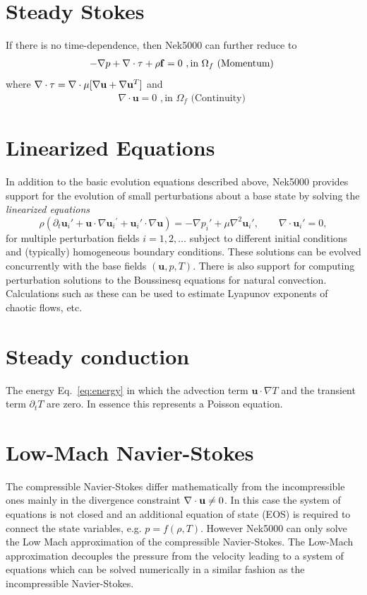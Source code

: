 \section{Steady Stokes }
If there is no time-dependence, then Nek5000 can further reduce to
\begin{eqnarray}\label{eq:ns_momentum_steady_stokes}
 - \nabla p + \nabla \cdot \tau + \rho {\bf f}=0 \,\, , \text{in } \Omega_f \text{  (Momentum)  }
\end{eqnarray}
where \(\nabla \cdot\tau=\nabla\cdot\mu[\nabla \mathbf{u}+\nabla {\mathbf{u} }^{T}]\) and
\begin{eqnarray}\label{eq:ns_cont_steady_stokes}
 \nabla \cdot \mathbf u =0 \,\, , \text{in } \Omega_f  \text{  (Continuity)  } 
\end{eqnarray}

\section{Linearized Equations}
In addition to the basic evolution equations described above, Nek5000
provides support for the evolution of small perturbations about
a base state by solving the {\em linearized equations}
\begin{equation} \label{eq:pertu}
  \rho(\partial_{t} {\mathbf u_i}' + \mathbf u \cdot \nabla {\mathbf u_i}^{'} + \mathbf u_i' \cdot \nabla \mathbf u) =
   - \nabla p_i' + \mu \nabla^2 \mathbf u_i', \qquad \nabla \cdot \mathbf u_i' = 0,
\end{equation}
for multiple perturbation fields \(i=1,2,\dots\) subject to different initial
conditions and (typically) homogeneous boundary conditions.  
These solutions can be evolved concurrently with the base fields \((\mathbf u,p,T)\).
There is also
support for computing perturbation solutions to the Boussinesq equations for
natural convection.  Calculations such as these can be used to estimate Lyapunov exponents of chaotic flows, etc.



\section{Steady conduction}    
The energy Eq.~\ref{eq:energy} in which the advection term \(\mathbf u \cdot \nabla T\)
    and the transient term \(\partial_{t} T\) are zero. In essence this represents a Poisson equation.
    

\section{Low-Mach Navier-Stokes}\label{sec:lowma}
The compressible Navier-Stokes differ mathematically from the incompressible ones mainly in the divergence constraint \(\nabla \cdot \mathbf{u}\neq 0\). In this case the system of equations is not closed and an additional equation of state (EOS) is required to connect the state variables, e.g. \(p=f(\rho,T)\). However Nek5000 can only solve the Low Mach approximation of the compressible Navier-Stokes. The Low-Mach approximation decouples the pressure from the velocity leading to a system of equations which can be solved numerically in a similar fashion as the incompressible Navier-Stokes.

